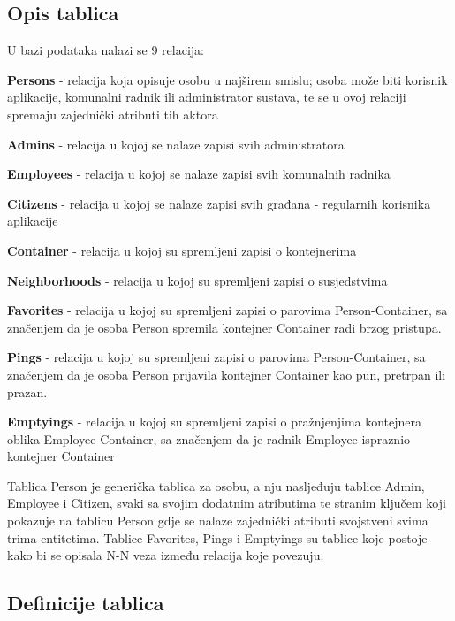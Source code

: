 			\subsection{Opis tablica}
			
				U bazi podataka nalazi se 9 relacija:
				\begin{packed_item}
					\item \textbf{Persons} - relacija koja opisuje osobu u najširem smislu; osoba može biti korisnik aplikacije, komunalni radnik ili administrator sustava, te se u ovoj relaciji spremaju zajednički atributi tih aktora
					\item \textbf{Admins} - relacija u kojoj se nalaze zapisi svih administratora
					\item \textbf{Employees} - relacija u kojoj se nalaze zapisi svih komunalnih radnika
					\item \textbf{Citizens} - relacija u kojoj se nalaze zapisi svih građana - regularnih korisnika aplikacije
					\item \textbf{Container} - relacija u kojoj su spremljeni zapisi o kontejnerima
					\item \textbf{Neighborhoods} - relacija u kojoj su spremljeni zapisi o susjedstvima
					\item \textbf{Favorites} - relacija u kojoj su spremljeni zapisi o parovima Person-Container, sa značenjem da je osoba Person spremila kontejner Container radi brzog pristupa.
					\item \textbf{Pings} - relacija u kojoj su spremljeni zapisi o parovima Person-Container, sa značenjem da je osoba Person prijavila kontejner Container kao pun, pretrpan ili prazan.
					\item \textbf{Emptyings} - relacija u kojoj su spremljeni zapisi o pražnjenjima kontejnera oblika Employee-Container, sa značenjem da je radnik Employee ispraznio kontejner Container
				\end{packed_item}
			
				Tablica Person je generička tablica za osobu, a nju nasljeđuju tablice Admin, Employee i Citizen, svaki sa svojim dodatnim atributima te stranim ključem koji pokazuje na tablicu Person gdje se nalaze zajednički atributi svojstveni svima trima entitetima.	Tablice Favorites, Pings i Emptyings su tablice koje postoje kako bi se opisala N-N veza između relacija koje povezuju.


			\subsection{Definicije tablica}
			
